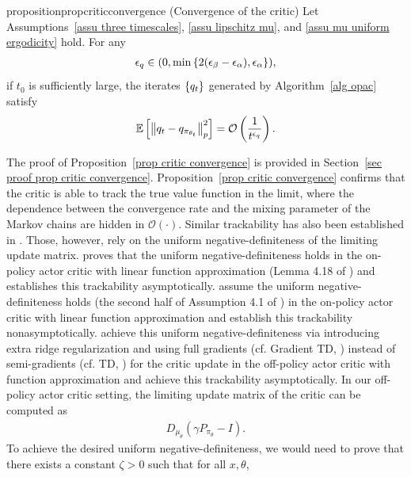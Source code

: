 \documentclass[twoside,11pt]{article}
\newcommand{\fO}{\mathcal{O}}
\newcommand{\E}{\mathbb{E}}
\numberwithin{assucounter}{section}
\begin{document}
\begin{restatable}{proposition}{propcriticconvergence}
  \label{prop critic convergence}
  (Convergence of the critic)
  Let Assumptions~\ref{assu three timescales}, \ref{assu lipschitz mu}, and \ref{assu mu uniform ergodicity} hold.
  For any
  \begin{align}
    \epsilon_q \in (0, \min\qty{2(\epsilon_\beta - \epsilon_\alpha), \epsilon_\alpha}),
  \end{align}
  if $t_0$ is sufficiently large,
  the iterates $\qty{q_t}$ generated by Algorithm~\ref{alg opac} satisfy
  \begin{align}
    \E\left[\norm{q_t - q_{\pi_{\theta_t}}}^2_p\right] = \fO\left(\frac{1}{t^{\epsilon_q}}\right).
  \end{align}
\end{restatable}
\noindent The proof of Proposition~\ref{prop critic convergence} is provided in Section~\ref{sec proof prop critic convergence}.
Proposition~\ref{prop critic convergence} confirms that the critic is able to track the true value function in the limit,
where the dependence between the convergence rate and the mixing parameter of the Markov chains are hidden in $\fO\left(\cdot\right)$.
Similar trackability has also been established in \citet{konda2002thesis,zhang2019provably,wu2020finite}.
Those, however,
rely on the uniform negative-definiteness of the limiting update matrix.
\citet{konda2002thesis} proves that the uniform negative-definiteness holds in the on-policy actor critic with linear function approximation (Lemma 4.18 of \citealt{konda2002thesis}) and establishes this trackability asymptotically.
\citet{wu2020finite} assume the uniform negative-definiteness holds (the second half of Assumption 4.1 of \citealt{wu2020finite}) in the on-policy actor critic with linear function approximation and establish this trackability nonasymptotically.
\citet{zhang2019provably} achieve this uniform negative-definiteness via introducing extra ridge regularization and using full gradients (cf. Gradient TD, \citealt{sutton2009fast})
instead of semi-gradients (cf. TD, \citealt{sutton1988learning}) for the critic update in the off-policy actor critic with function approximation
and achieve this trackability asymptotically.
In our off-policy actor critic setting,
the limiting update matrix of the critic can be computed as
\begin{align}
  D_{\mu_\theta}(\gamma P_{\pi_\theta} - I).
\end{align}
To achieve the desired uniform negative-definiteness,
we would need to prove that there exists a constant $\zeta > 0$ such that for all $x, \theta$,
\end{document}

